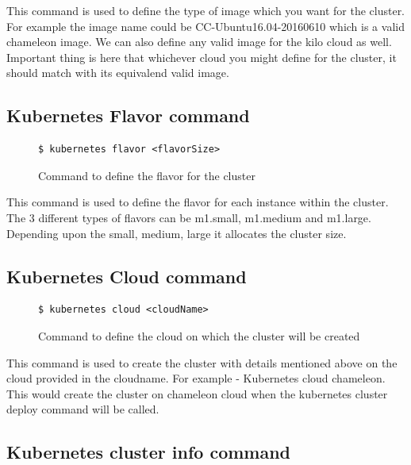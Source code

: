 \documentclass[9pt,twocolumn,twoside]{../../styles/osajnl}
\begin{document}
This command is used to define the type of image which you want for
the cluster.  For example the image name could be
CC-Ubuntu16.04-20160610 which is a valid chameleon image. We can also
define any valid image for the kilo cloud as well.  Important thing is
here that whichever cloud you might define for the cluster, it should
match with its equivalend valid image.

\subsection{Kubernetes Flavor command}
\begin{figure}[H]
\begin{verbatim}
$ kubernetes flavor <flavorSize>
\end{verbatim}
\caption{Command to define the flavor for the cluster}
\vspace{-4mm}
\label{Command to define the flavor for the cluster}
\end{figure}

This command is used to define the flavor for each instance within the
cluster. The 3 different types of flavors can be m1.small,
m1.medium and m1.large.  Depending upon the small, medium, large it
allocates the cluster size.

\subsection{Kubernetes Cloud command}
\begin{figure}[H]
\begin{verbatim}
$ kubernetes cloud <cloudName>
\end{verbatim}
\caption{Command to define the cloud on which the cluster will be created}
\vspace{-4mm}
\label{Command to define the cloud}
\end{figure}

This command is used to create the cluster with details mentioned
above on the cloud provided in the cloudname.  For example -
Kubernetes cloud chameleon. This would create the cluster on chameleon
cloud when the kubernetes cluster deploy command will be called.

\subsection{Kubernetes cluster info command}
\end{document}
